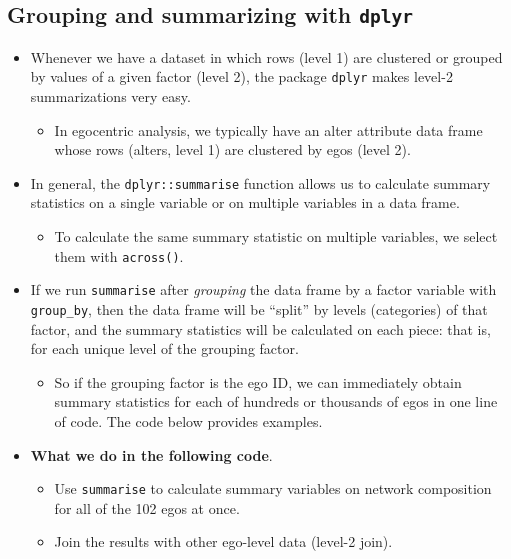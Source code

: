 \documentclass[
]{book}
\providecommand{\tightlist}{%
  \setlength{\itemsep}{0pt}\setlength{\parskip}{0pt}}
\begin{document}
\hypertarget{summarize-dplyr}{%
\subsection{\texorpdfstring{Grouping and summarizing with \texttt{dplyr}}{Grouping and summarizing with dplyr}}\label{summarize-dplyr}}

\begin{itemize}
\tightlist
\item
  Whenever we have a dataset in which rows (level 1) are clustered or grouped by values of a given factor (level 2), the package \texttt{dplyr} makes level-2 summarizations very easy.

  \begin{itemize}
  \tightlist
  \item
    In egocentric analysis, we typically have an alter attribute data frame whose rows (alters, level 1) are clustered by egos (level 2).
  \end{itemize}
\item
  In general, the \texttt{dplyr::summarise} function allows us to calculate summary statistics on a single variable or on multiple variables in a data frame.

  \begin{itemize}
  \tightlist
  \item
    To calculate the same summary statistic on multiple variables, we select them with \texttt{across()}.
  \end{itemize}
\item
  If we run \texttt{summarise} after \emph{grouping} the data frame by a factor variable with \texttt{group\_by}, then the data frame will be ``split'' by levels (categories) of that factor, and the summary statistics will be calculated on each piece: that is, for each unique level of the grouping factor.

  \begin{itemize}
  \tightlist
  \item
    So if the grouping factor is the ego ID, we can immediately obtain summary statistics for each of hundreds or thousands of egos in one line of code. The code below provides examples.
  \end{itemize}
\item
  \textbf{What we do in the following code}.

  \begin{itemize}
  \tightlist
  \item
    Use \texttt{summarise} to calculate summary variables on network composition for all of the 102 egos at once.
  \item
    Join the results with other ego-level data (level-2 join).
  \end{itemize}
\end{itemize}
\end{document}
